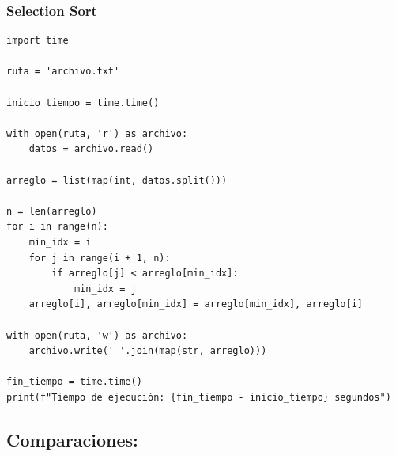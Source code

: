 \subsubsection{Selection Sort}
\begin{verbatim}
import time

ruta = 'archivo.txt'

inicio_tiempo = time.time()

with open(ruta, 'r') as archivo:
    datos = archivo.read()

arreglo = list(map(int, datos.split()))

n = len(arreglo)
for i in range(n):
    min_idx = i
    for j in range(i + 1, n):
        if arreglo[j] < arreglo[min_idx]:
            min_idx = j
    arreglo[i], arreglo[min_idx] = arreglo[min_idx], arreglo[i]

with open(ruta, 'w') as archivo:
    archivo.write(' '.join(map(str, arreglo)))

fin_tiempo = time.time()
print(f"Tiempo de ejecución: {fin_tiempo - inicio_tiempo} segundos")
\end{verbatim}
\subsection{Comparaciones:}

